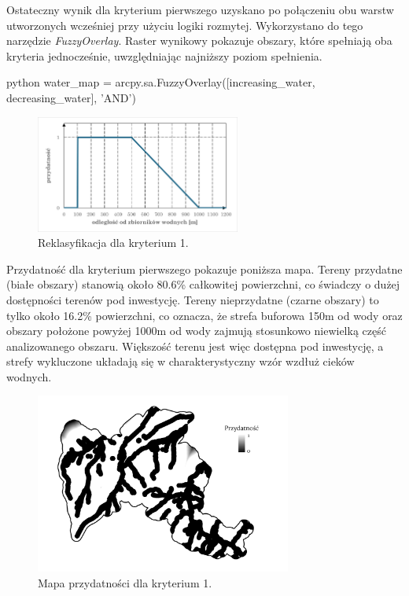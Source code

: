 \documentclass{article}
\begin{document}
Ostateczny wynik dla kryterium pierwszego uzyskano po połączeniu obu warstw utworzonych wcześniej przy użyciu logiki rozmytej. Wykorzystano do tego narzędzie \textit{FuzzyOverlay}. Raster wynikowy pokazuje obszary, które spełniają oba kryteria jednocześnie, uwzględniając najniższy poziom spełnienia.
\vspace{5pt}

\begin{mintedbox}{python}
water_map = arcpy.sa.FuzzyOverlay([increasing_water, decreasing_water], 'AND')
\end{mintedbox}
\vspace{5pt}

\begin{figure}[H]
    \centering
    \includegraphics[width=0.6\textwidth]{img/kryterium1-wykres-glowny.png}
    \caption{Reklasyfikacja dla kryterium 1.}
\end{figure}

Przydatność dla kryterium pierwszego pokazuje poniższa mapa. \newline
Tereny przydatne (białe obszary) stanowią około 80.6\% całkowitej powierzchni, co świadczy o dużej dostępności terenów pod inwestycję. Tereny nieprzydatne (czarne obszary) to tylko około 16.2\% powierzchni, co oznacza, że strefa buforowa 150m od wody oraz obszary położone powyżej 1000m od wody zajmują stosunkowo niewielką część analizowanego obszaru. \newline
Większość terenu jest więc dostępna pod inwestycję, a strefy wykluczone układają się w charakterystyczny wzór wzdłuż cieków wodnych.
\vspace{5pt}

\begin{figure}[H]
    \centering
    \includegraphics[width=0.75\textwidth]{img/kryterium1-layout.jpg}
    \caption{Mapa przydatności dla kryterium 1.}
    \label{mapa-przydatnosci-1}
\end{figure}
\vspace{10pt}
\newpage
\end{document}
